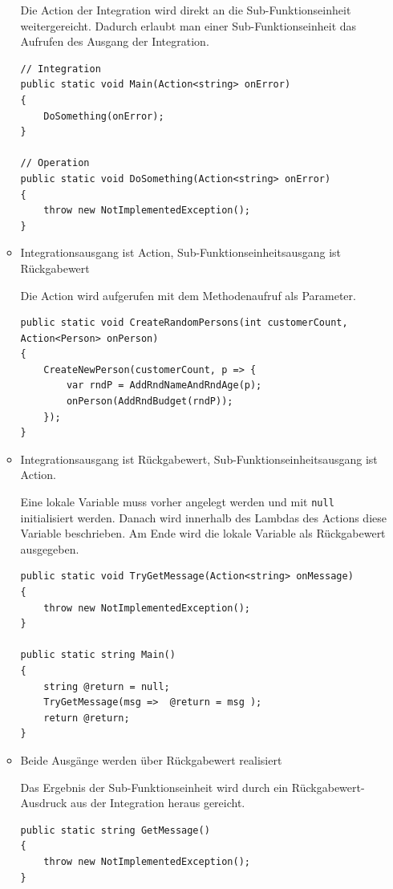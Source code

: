 \begin{enumerate}
\begin{itemize}
			Die Action der Integration wird direkt an die Sub-Funktionseinheit
			weitergereicht. Dadurch erlaubt man einer Sub-Funktionseinheit das
			Aufrufen des Ausgang der Integration.
			
			\begin{lstlisting}[caption=Action-Action-Beziehung]
// Integration
public static void Main(Action<string> onError)
{
	DoSomething(onError);
}

// Operation
public static void DoSomething(Action<string> onError)
{
	throw new NotImplementedException();
}
			\end{lstlisting}
			
			
			\item Integrationsausgang ist Action, Sub-Funktionseinheitsausgang ist
			Rückgabewert 
			
			Die Action wird aufgerufen mit dem Methodenaufruf als Parameter.
			
\begin{lstlisting}[caption=Action-Return-Beziehung]
public static void CreateRandomPersons(int customerCount, Action<Person> onPerson)
{
	CreateNewPerson(customerCount, p => {
		var rndP = AddRndNameAndRndAge(p);
		onPerson(AddRndBudget(rndP));
	});
}
\end{lstlisting}
			\item Integrationsausgang ist Rückgabewert, Sub-Funktionseinheitsausgang ist
			Action.
			
			Eine lokale Variable muss vorher angelegt werden und mit \texttt{null}
			initialisiert werden. Danach wird innerhalb des Lambdas des Actions diese
			Variable beschrieben. Am Ende wird die lokale Variable als Rückgabewert
			ausgegeben.
			
\begin{lstlisting}[caption=Return-Action-Beziehung]
public static void TryGetMessage(Action<string> onMessage)
{
	throw new NotImplementedException();
}

public static string Main()
{
	string @return = null;
	TryGetMessage(msg =>  @return = msg );
	return @return;	
}
\end{lstlisting}

			\item Beide Ausgänge werden über Rückgabewert realisiert
			
		    Das Ergebnis der Sub-Funktionseinheit wird durch ein Rückgabewert-Ausdruck aus der Integration heraus gereicht.
		    
\begin{lstlisting}[caption=Return-Return-Beziehung]
public static string GetMessage()
{
	throw new NotImplementedException();
}


\end{lstlisting}
\end{itemize}
\end{enumerate}
